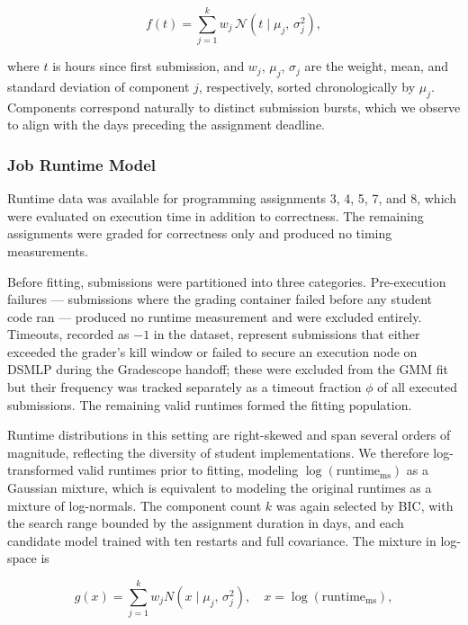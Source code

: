 \documentclass[acmlarge]{acmart}
\begin{document}
\begin{equation}
    f(t) = \sum_{j=1}^{k} w_j \,\mathcal{N}(t \mid \mu_j,\, \sigma_j^2),
    \label{eq:timing_gmm}
\end{equation}
 
\noindent where $t$ is hours since first submission, and $w_j$,
$\mu_j$, $\sigma_j$ are the weight, mean, and standard deviation of
component $j$, respectively, sorted chronologically by $\mu_j$.
Components correspond naturally to distinct submission bursts, which
we observe to align with the days preceding the assignment deadline.

\subsubsection{Job Runtime Model}
 
Runtime data was available for programming assignments 3, 4, 5, 7, and
8, which were evaluated on execution time in addition to correctness.
The remaining assignments were graded for correctness only and
produced no timing measurements.
 
Before fitting, submissions were partitioned into three categories.
Pre-execution failures --- submissions where the grading container
failed before any student code ran --- produced no runtime measurement
and were excluded entirely. Timeouts, recorded as $-1$ in the dataset,
represent submissions that either exceeded the grader's kill window or
failed to secure an execution node on DSMLP during the Gradescope
handoff; these were excluded from the GMM fit but their frequency was
tracked separately as a timeout fraction $\phi$ of all executed
submissions. The remaining valid runtimes formed the fitting population.
 
Runtime distributions in this setting are right-skewed and span
several orders of magnitude, reflecting the diversity of student
implementations. We therefore log-transformed valid runtimes prior to
fitting, modeling $\log(\text{runtime}_{\text{ms}})$ as a Gaussian
mixture, which is equivalent to modeling the original runtimes as a
mixture of log-normals. The component count $k$ was again selected by
BIC, with the search range bounded by the assignment duration in days,
and each candidate model trained with ten restarts and full covariance.
The mixture in log-space is
 
\begin{equation}
    g(x) = \sum_{j=1}^{k} w_j {N}(x \mid \mu_j,\, \sigma_j^2),
    \quad x = \log(\text{runtime}_{\text{ms}}),
    \label{eq:runtime_gmm}
\end{equation}
 
\end{document}
